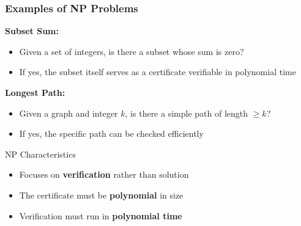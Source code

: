 \documentclass[10pt,aspectratio=43]{beamer}
\begin{document}
\begin{frame}
  \frametitle{Examples of NP Problems}
  
  \textbf{Subset Sum:}
  \begin{itemize}
      \item Given a set of integers, is there a subset whose sum is zero?
      \vspace{3pt}
      \item If yes, the subset itself serves as a certificate verifiable in polynomial time
  \end{itemize}
  
  \vspace{0.5cm}
  
  \textbf{Longest Path:}
  \begin{itemize}
      \item Given a graph and integer $k$, is there a simple path of length $\geq k$?
      \vspace{3pt}
      \item If yes, the specific path can be checked efficiently
  \end{itemize}
  
  \vspace{0.5cm}
  
  \begin{block}{NP Characteristics}
      \begin{itemize}
          \item Focuses on \textbf{verification} rather than solution
          \vspace{3pt}
          \item The certificate must be \textbf{polynomial} in size
          \vspace{3pt}
          \item Verification must run in \textbf{polynomial time}
      \end{itemize}
  \end{block}
\end{frame}
\end{document}
